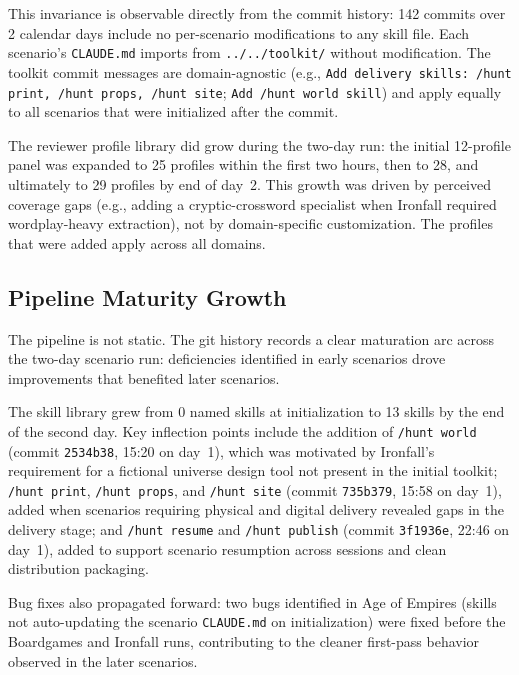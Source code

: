 This invariance is observable directly from the commit history: 142 commits over 2 calendar days include no per-scenario modifications to any skill file. Each scenario's \texttt{CLAUDE.md} imports from \texttt{../../toolkit/} without modification. The toolkit commit messages are domain-agnostic (e.g., \texttt{Add delivery skills: /hunt print, /hunt props, /hunt site}; \texttt{Add /hunt world skill}) and apply equally to all scenarios that were initialized after the commit.

The reviewer profile library did grow during the two-day run: the initial 12-profile panel was expanded to 25 profiles within the first two hours, then to 28, and ultimately to 29 profiles by end of day~2. This growth was driven by perceived coverage gaps (e.g., adding a cryptic-crossword specialist when Ironfall required wordplay-heavy extraction), not by domain-specific customization. The profiles that were added apply across all domains.

\subsection{Pipeline Maturity Growth}
\label{sec:maturity}

The pipeline is not static. The git history records a clear maturation arc across the two-day scenario run: deficiencies identified in early scenarios drove improvements that benefited later scenarios.

The skill library grew from 0 named skills at initialization to 13 skills by the end of the second day. Key inflection points include the addition of \texttt{/hunt world} (commit \texttt{2534b38}, 15:20 on day~1), which was motivated by Ironfall's requirement for a fictional universe design tool not present in the initial toolkit; \texttt{/hunt print}, \texttt{/hunt props}, and \texttt{/hunt site} (commit \texttt{735b379}, 15:58 on day~1), added when scenarios requiring physical and digital delivery revealed gaps in the delivery stage; and \texttt{/hunt resume} and \texttt{/hunt publish} (commit \texttt{3f1936e}, 22:46 on day~1), added to support scenario resumption across sessions and clean distribution packaging.

Bug fixes also propagated forward: two bugs identified in Age of Empires (skills not auto-updating the scenario \texttt{CLAUDE.md} on initialization) were fixed before the Boardgames and Ironfall runs, contributing to the cleaner first-pass behavior observed in the later scenarios.

